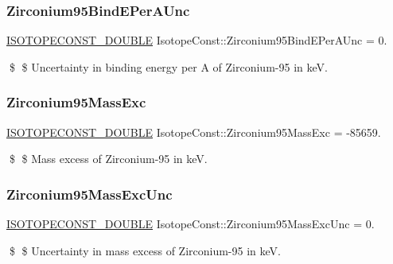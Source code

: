 \subsubsection{\texorpdfstring{Zirconium95\+Bind\+E\+Per\+A\+Unc}{Zirconium95BindEPerAUnc}}
{\footnotesize\ttfamily \mbox{\hyperlink{group___isotope_const-_macros_ga8f45a7272ce02c0b4c65c44636ed719a}{I\+S\+O\+T\+O\+P\+E\+C\+O\+N\+S\+T\+\_\+\+D\+O\+U\+B\+LE}} Isotope\+Const\+::\+Zirconium95\+Bind\+E\+Per\+A\+Unc = 0.}

\$ \$ Uncertainty in binding energy per A of Zirconium-\/95 in keV. \mbox{\label{group___isotope_const-_zirconium-_zr95_gaa39d8f615ffdf6c7367bb81760afbb87}} 
\subsubsection{\texorpdfstring{Zirconium95\+Mass\+Exc}{Zirconium95MassExc}}
{\footnotesize\ttfamily \mbox{\hyperlink{group___isotope_const-_macros_ga8f45a7272ce02c0b4c65c44636ed719a}{I\+S\+O\+T\+O\+P\+E\+C\+O\+N\+S\+T\+\_\+\+D\+O\+U\+B\+LE}} Isotope\+Const\+::\+Zirconium95\+Mass\+Exc = -\/85659.}

\$ \$ Mass excess of Zirconium-\/95 in keV. \mbox{\label{group___isotope_const-_zirconium-_zr95_ga5068da7a4a35f8e9c4a8ce527f07ff01}} 
\subsubsection{\texorpdfstring{Zirconium95\+Mass\+Exc\+Unc}{Zirconium95MassExcUnc}}
{\footnotesize\ttfamily \mbox{\hyperlink{group___isotope_const-_macros_ga8f45a7272ce02c0b4c65c44636ed719a}{I\+S\+O\+T\+O\+P\+E\+C\+O\+N\+S\+T\+\_\+\+D\+O\+U\+B\+LE}} Isotope\+Const\+::\+Zirconium95\+Mass\+Exc\+Unc = 0.}

\$ \$ Uncertainty in mass excess of Zirconium-\/95 in keV. \mbox{\label{group___isotope_const-_zirconium-_zr95_ga02b1a8af878b6cfdb295370ebbd353d6}} 
